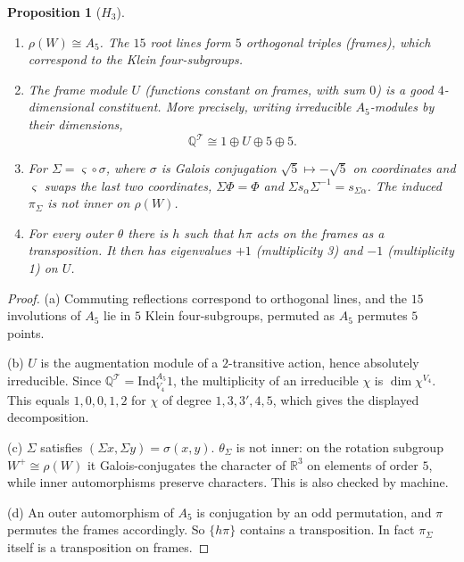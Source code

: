 \documentclass[11pt]{amsart}
\newtheorem{proposition}[theorem]{Proposition}
\theoremstyle{definition}
\newcommand{\Q}{\mathbb{Q}}
\newcommand{\T}{\mathcal{T}}
\begin{document}
\begin{proposition}[$H_3$]\label{prop:H3}
\begin{enumerate}[label=(\alph*)]
\item $\rho(W)\cong A_5$. The $15$ root lines form $5$ orthogonal triples (\emph{frames}), which correspond to the
Klein four-subgroups.
\item The frame module $U$ (functions constant on frames, with sum $0$) is a good $4$-dimensional constituent.
More precisely, writing irreducible $A_5$-modules by their dimensions,
\[\Q^\T\cong1\oplus U\oplus5\oplus5 .\]
\item For $\Sigma=\varsigma\circ\sigma$, where $\sigma$ is Galois conjugation $\sqrt5\mapsto-\sqrt5$ on coordinates
and $\varsigma$ swaps the last two coordinates, $\Sigma\Phi=\Phi$ and $\Sigma s_\alpha\Sigma^{-1}=s_{\Sigma\alpha}$. The
induced $\pi_\Sigma$ is not inner on $\rho(W)$.
\item For every outer $\theta$ there is $h$ such that $h\pi$ acts on the frames as a transposition. It then has
eigenvalues $+1$ (multiplicity 3) and $-1$ (multiplicity 1) on $U$.
\end{enumerate}
\end{proposition}

\begin{proof}
(a) Commuting reflections correspond to orthogonal lines, and the $15$ involutions of $A_5$ lie in $5$ Klein
four-subgroups, permuted as $A_5$ permutes $5$ points.

(b) $U$ is the augmentation module of a $2$-transitive action, hence absolutely irreducible. Since
$\Q^\T=\mathrm{Ind}_{V_4}^{A_5}1$, the multiplicity of an irreducible $\chi$ is $\dim\chi^{V_4}$. This equals
$1,0,0,1,2$ for $\chi$ of degree $1,3,3',4,5$, which gives the displayed decomposition.

(c) $\Sigma$ satisfies $(\Sigma x,\Sigma y)=\sigma(x,y)$. $\theta_\Sigma$ is not inner: on the rotation subgroup $W^+\cong\rho(W)$ it Galois-conjugates the character of
$\mathbb R^3$ on elements of order $5$, while inner automorphisms preserve characters. This is also checked by
machine.

(d) An outer automorphism of $A_5$ is conjugation by an odd permutation, and $\pi$ permutes the frames accordingly.
So $\{h\pi\}$ contains a transposition. In fact $\pi_\Sigma$ itself is a transposition on frames.
\end{proof}
\end{document}
